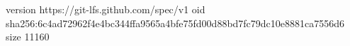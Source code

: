 version https://git-lfs.github.com/spec/v1
oid sha256:6c4ad72962f4e4bc344ffa9565a4bfe75fd00d88bd7fc79dc10e8881ca7556d6
size 11160
